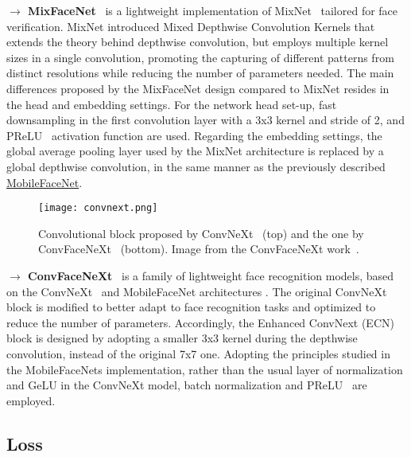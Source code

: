 \documentclass[class=report, crop=false, a4paper, 12pt]{standalone}
\begin{document}
\noindent\textbf{$\rightarrow$ MixFaceNet}~\autocite{boutrosMixFaceNetsExtremelyEfficient2021} is a lightweight implementation of MixNet~\autocite{tanMixConvMixedDepthwise} tailored for face verification. MixNet introduced Mixed Depthwise Convolution Kernels  that extends the theory behind depthwise convolution, but employs multiple kernel sizes in a single convolution, promoting the capturing of different patterns from distinct resolutions while reducing the number of parameters needed. The main differences proposed by the MixFaceNet design compared to MixNet resides in the head and embedding settings. For the network head set-up, fast downsampling in the first convolution layer with a 3x3 kernel and stride of 2, and PReLU~\autocite{heDelvingDeepRectifiers2015} activation function are used. Regarding the embedding settings, the global average pooling layer used by the MixNet architecture is replaced by a global depthwise convolution, in the same manner as the previously described \hyperref[mobilefacenet]{MobileFaceNet}.

\begin{figure}[H]
    \centering
    \texttt{[image: convnext.png]}
    \caption{Convolutional block proposed by ConvNeXt~\autocite{liuConvNet2020s2022} (top) and the one by ConvFaceNeXt~\autocite{hooConvFaceNeXtLightweightNetworks2022} (bottom). Image from the ConvFaceNeXt work~\autocite{hooConvFaceNeXtLightweightNetworks2022}.}
    \label{fig:convnext}
\end{figure}

\noindent\textbf{$\rightarrow$ ConvFaceNeXt}~\autocite{hooConvFaceNeXtLightweightNetworks2022} is a family of lightweight face recognition models, based on the ConvNeXt~\autocite{liuConvNet2020s2022} and MobileFaceNet architectures . The original ConvNeXt block is modified to better adapt to face recognition tasks and optimized to reduce the number of parameters. Accordingly, the Enhanced ConvNext (ECN) block is designed by adopting a smaller 3x3 kernel during the depthwise convolution, instead of the original 7x7 one. Adopting the principles studied in the MobileFaceNets implementation, rather than the usual layer of normalization and GeLU in the ConvNeXt model, batch normalization and PReLU~\autocite{heDelvingDeepRectifiers2015} are employed. 

\subsection{Loss}
\end{document}
